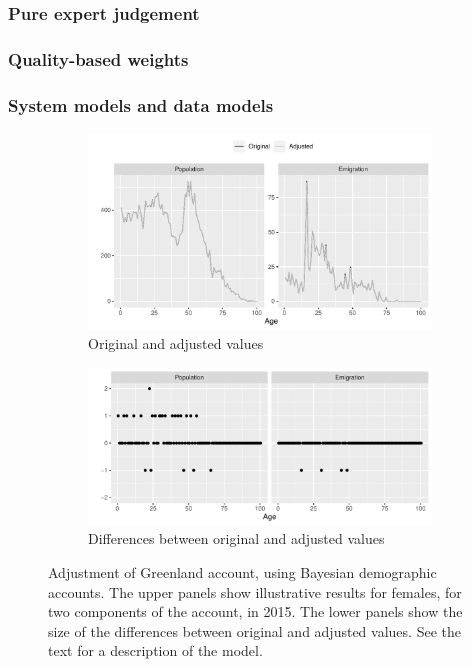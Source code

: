 \documentclass[USenglish]{article}
\begin{document}
\subsubsection{Pure expert judgement}

\citep{lomax2013subnational}


\subsubsection{Quality-based weights}




\subsubsection{System models and data models}

\citep{bryant2013bayesian} \citep{wheldon2013reconstructing}\citep{wheldon2015bayesian}

\begin{figure}
    \centering
    \begin{subfigure}{\textwidth}
    \includegraphics[width=\textwidth]{estimate_account/out/fig_values}
    \caption{Original and adjusted values}
    \end{subfigure}
    \begin{subfigure}{\textwidth}
    \includegraphics[width=\textwidth]{estimate_account/out/fig_diff}
    \caption{Differences between original and adjusted values}
    \end{subfigure} 
    \caption{Adjustment of Greenland account, using Bayesian demographic accounts. The upper panels show illustrative results for females, for two components of the account, in 2015. The lower panels show the size of the differences between original and adjusted values. See the text for a description of the model.   }
    \label{fig:my_label}
\end{figure}
\end{document}

